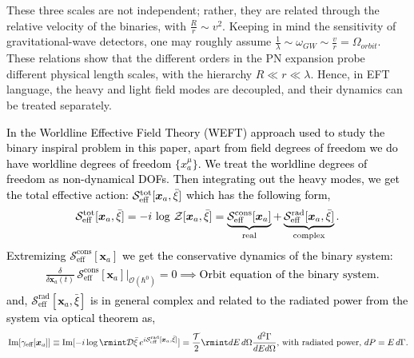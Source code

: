 These three scales are not independent; rather, they are related through the relative velocity of the binaries, with $\frac{R}{r}\sim v^2$. Keeping in mind the sensitivity of gravitational-wave detectors, one may roughly assume $\frac{1}{\lambda}\sim \omega_{GW}\sim \frac{v}{r}=\Omega_{orbit}$. These relations show that the different orders in the PN expansion probe different physical length scales, with the hierarchy $R\ll r \ll\lambda$. Hence, in EFT language, the heavy and light field modes are decoupled, and their dynamics can be treated separately.  %
\par
\textcolor{black}{In the Worldline Effective Field Theory (WEFT) approach used to study the binary inspiral problem in this paper, apart from field degrees of freedom we do have worldline degrees of freedom $\{x^{\mu}_{a}\}$. We treat the worldline degrees of freedom as non-dynamical DOFs. Then integrating out the heavy modes, we get the total effective action: $\mathcal{S}_{\text{eff}}^{\text{tot}}[\boldsymbol{x}_a,\Bar{\xi}]$ which has the following form,
\begin{align}
    \begin{split}
        \mathcal{S}_{\text{eff}}^{\text{tot}}[\boldsymbol{x}_a,\Bar{\xi}]=-i\,\log\,\mathcal{Z}[\boldsymbol{x}_a,\Bar{\xi}]=\underbrace{\mathcal{S}_{\text{eff}}^{\text{cons}}[\boldsymbol{x}_a]}_{\text{real}}+\underbrace{\mathcal{S}_{\text{eff}}^{\text{rad}}[\boldsymbol{x}_a,\bar\xi]}_{\text{complex}}.
    \end{split}
\end{align}
Extremizing $\mathcal{S}_{\text{eff}}^{\text{cons}}[\boldsymbol{x}_a]$ we get the conservative dynamics of the binary system:
\begin{align}
    \begin{split}
     &    \frac{\delta}{\delta \boldsymbol{x}_a(t)}\,\mathcal{S}_{\text{eff}}^{\text{cons}}[\boldsymbol{x}_a]\Big |_{\mathcal{O}(\hbar^0)}=0 \implies \text{Orbit equation of the binary system.}
    \end{split}
\end{align}
and, $ \mathcal{S}_{\text{eff}}^{\text{rad}}[\boldsymbol{x}_a,\bar\xi]$ is in general complex and related to the radiated power from the system via optical theorem as,
\begin{align}
    \begin{split}
        \,\text{Im}[\gamma_{\text{eff}}[\boldsymbol{x}_a]]\equiv \text{Im}[-i\log\rmint \mathcal{D}\bar\xi \,e^{i\mathcal{S}_{\text{eff}}^{\text{rad}}[\boldsymbol{x}_a,\bar\xi]}]=\frac{\mathcal{T}}{2}\rmint dE\,d\Omega \frac{d^2\Gamma}{dEd\Omega},\,\text{with radiated power},\, dP=E\,d\Gamma.
    \end{split}
\end{align}}

